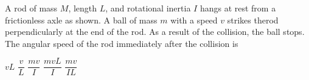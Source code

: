 \documentclass{../../oss-apphys-exam}
\begin{document}
\begin{multicols*}{2}
\begin{questions}
    \question A rod of mass $M$, length $L$, and rotational inertia $I$ hangs
    at rest from a frictionless axle as shown. A ball of mass $m$ with a speed
    $v$ strikes therod perpendicularly at the end of the rod. As a result
    of the collision, the ball stops. The angular speed of the rod immediately
    after the collision is
    \begin{center}
    \end{center}
    \begin{choices}
      \choice $vL$
      \choice $\dfrac vL$
      \choice $\dfrac{mv}I$
      \choice $\dfrac{mv L}I$
      \choice $\dfrac{mv}{IL}$
    \end{choices}
    \columnbreak
    
    

\end{questions}
\end{multicols*}
\end{document}
